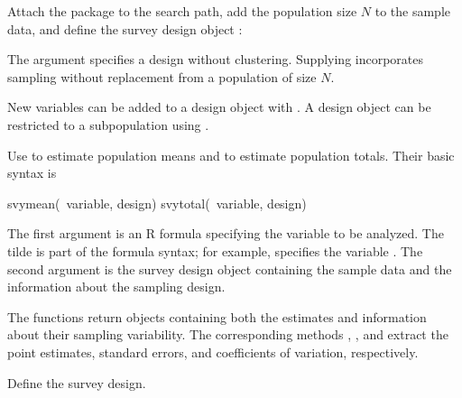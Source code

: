 \begin{Problem}
\begin{Subtask}
        \begin{Rhint}
            Attach the  package to the search path, add the
            population size $N$ to the sample data, and define the survey
            design object :


            The argument  specifies a design without clustering.
            Supplying  incorporates sampling without replacement
            from a population of size $N$.

            New variables can be added to a design object with .
            A design object can be restricted to a subpopulation using
            .

            Use  to estimate population means and
             to estimate population totals. Their basic syntax
            is
\begin{Scode}
svymean(~variable, design)
svytotal(~variable, design)
\end{Scode}
            The first argument is an R formula specifying the variable to be
            analyzed. The tilde \code{~} is part of the formula syntax; for
            example,  specifies the variable . The
            second argument is the survey design object containing the sample
            data and the information about the sampling design.

            The functions return objects containing both the estimates and
            information about their sampling variability. The corresponding
            methods , , and  extract the
            point estimates, standard errors, and coefficients of variation,
            respectively.
        \end{Rhint}

    \begin{Solution}
        Define the survey design.

\begin{Schunk}
\end{Schunk}


\end{Solution}
\end{Subtask}
\end{Problem}
